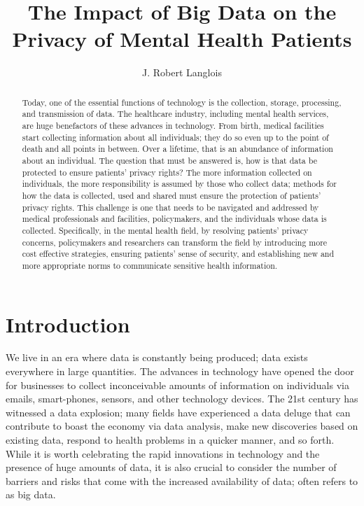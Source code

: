\documentclass[sigconf]{acmart}
\begin{document}
\title{The Impact of Big Data on the Privacy of  Mental Health Patients}


\author{J. Robert Langlois }



\begin{abstract}

Today, one of the essential functions of technology is the collection, storage, processing, and transmission of data. The healthcare industry, including mental health services, are huge benefactors of these advances in technology. From birth, medical facilities start collecting information about all individuals; they do so even up to the point of death and all points in between. Over a lifetime, that is an abundance of information about an individual. The question that must be answered is, how is that data be protected to ensure patients' privacy rights? The more information collected on individuals, the more responsibility is assumed by those who collect data; methods for how the data is collected, used and shared must ensure the protection of patients' privacy rights. This challenge is one that needs to be navigated and addressed by medical professionals and facilities, policymakers, and the individuals whose data is collected. Specifically, in the mental health field, by resolving patients' privacy concerns, policymakers and researchers can transform the field by introducing more cost effective strategies, ensuring patients' sense of security, and establishing new and more appropriate norms to communicate sensitive health information. 
\end{abstract}



\maketitle

\section{Introduction}

We live in an era where data is constantly being produced; data exists everywhere in large quantities. The advances in technology have opened the door for businesses to collect inconceivable amounts of information on individuals via emails, smart-phones, sensors, and other technology devices. The 21st century has witnessed a data explosion; many fields have experienced a data deluge that can contribute to boast the economy via data analysis, make new discoveries based on existing data, respond to health problems in a quicker manner, and so forth. While it is worth celebrating the rapid innovations in technology and the presence of huge amounts of data, it is also crucial to consider the number of barriers and risks that come with the increased availability of data; often refers to as big data.
\end{document}
